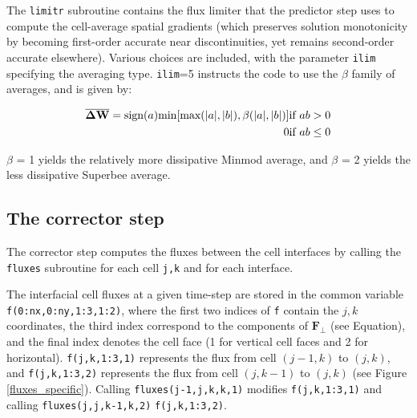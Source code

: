 \documentclass{article}
\newcommand{\code}[1]{\texttt{#1}}
\begin{document}
The \code{limitr} subroutine contains the flux limiter that the predictor step uses to compute the cell-average spatial gradients (which preserves solution monotonicity by becoming first-order accurate near discontinuities, yet remains second-order accurate elsewhere).
Various choices are included, with the parameter \code{ilim} specifying the averaging type. \code{ilim}=5 instructs the code to use the $\beta$ family of averages, and is given by:

\begin{eqnarray*}
	\mathbf{\overline{\Delta W}} = \text{sign}(a)\text{min}[\text{max}(|a|, |b|), \beta(|a|, |b|)]  \textmd{if }  ab>0  \\ 
	0 \textmd{if }  ab \leq 0	
\end{eqnarray*}

$\beta$ = 1 yields the relatively more dissipative Minmod average, and $\beta $ = 2 yields the less dissipative Superbee average. 


\subsection{The corrector step}

The corrector step computes the fluxes between the cell interfaces by calling the \code{fluxes} subroutine for each cell \code{j,k} and for each interface. 

The interfacial cell fluxes at a given time-step are stored in the common variable \code{f(0:nx,0:ny,1:3,1:2)}, where the first two indices of \code{f} contain the $j,k$ coordinates, the third index correspond to the components of  $\mathbf{F_\perp}$ (see Equation), and the final index denotes the cell face (1 for vertical cell faces and 2 for horizontal).   
\code{f(j,k,1:3,1)} represents the flux from cell $(j-1, k)$ to $(j, k)$, and
\code{f(j,k,1:3,2)} represents the flux from cell $(j, k-1)$ to $(j, k)$ (see Figure \ref{fluxes_specific}).
Calling \code{fluxes(j-1,j,k,k,1)} modifies \code{f(j,k,1:3,1)}  and calling \code{fluxes(j,j,k-1,k,2)} \code{f(j,k,1:3,2)}.
\end{document}
